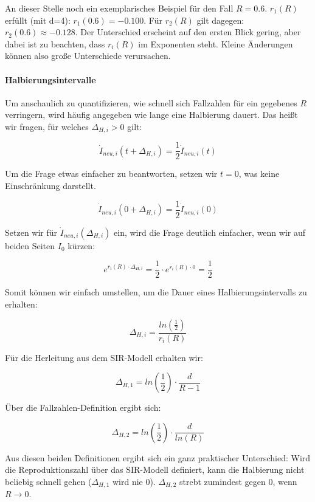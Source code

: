 \documentclass[a4paper]{article}
\begin{document}
    An dieser Stelle noch ein exemplarisches Beispiel für den Fall $R=0.6$. $r_1(R)$ erfüllt (mit d=4): $r_1(0.6)=-0.100$. Für $r_2(R)$ gilt dagegen: $r_2(0.6) \approx -0.128$. Der Unterschied erscheint auf den ersten Blick gering, aber dabei ist zu beachten, dass $r_{i}(R)$ im Exponenten steht. Kleine Änderungen können also große Unterschiede verursachen.

    \paragraph{Halbierungsintervalle}Um anschaulich zu quantifizieren, wie schnell sich Fallzahlen für ein gegebenes $R$ verringern, wird häufig angegeben wie lange eine Halbierung dauert. Das heißt wir fragen, für welches $\Delta_{H,i}>0$ gilt: 

    \begin{equation}
        \dot{I}_{neu,i}(t+\Delta_{H,i}) = \frac{1}{2} \dot{I}_{neu,i}(t)
    \end{equation}

    Um die Frage etwas einfacher zu beantworten, setzen wir $t=0$, was keine Einschränkung darstellt. 

    $$ \dot{I}_{neu,i}(0 + \Delta_{H,i}) = \frac{1}{2} \dot{I}_{neu,i}(0) $$

    Setzen wir für $\dot{I}_{neu,i}(\Delta_{H,i})$ ein, wird die Frage deutlich einfacher, wenn wir auf beiden Seiten $I_0$ kürzen:

    $$ e^{r_{i}(R) \cdot \Delta_{H,i}} = \frac{1}{2} \cdot e^{r_{i}(R) \cdot 0} = \frac{1}{2} $$

    Somit können wir einfach umstellen, um die Dauer eines Halbierungsintervalls zu erhalten: 

    \begin{equation}
        \Delta_{H,i} =  \frac{ ln(\frac{1}{2}) }{ r_{i}(R) }
    \end{equation}

    Für die Herleitung aus dem SIR-Modell erhalten wir: 

    $$ \Delta_{H,1} = ln(\frac{1}{2}) \cdot \frac{d}{R-1} $$

    Über die Fallzahlen-Definition ergibt sich: 

    $$ \Delta_{H,2} = ln(\frac{1}{2}) \cdot \frac{d}{ln(R)} $$

    Aus diesen beiden Definitionen ergibt sich ein ganz praktischer Unterschied: Wird die Reproduktionszahl über das SIR-Modell definiert, kann die Halbierung nicht beliebig schnell gehen ($\Delta_{H, 1}$ wird nie $0$). $\Delta_{H, 2}$ strebt zumindest gegen 0, wenn $R \rightarrow 0$. 
\end{document}
